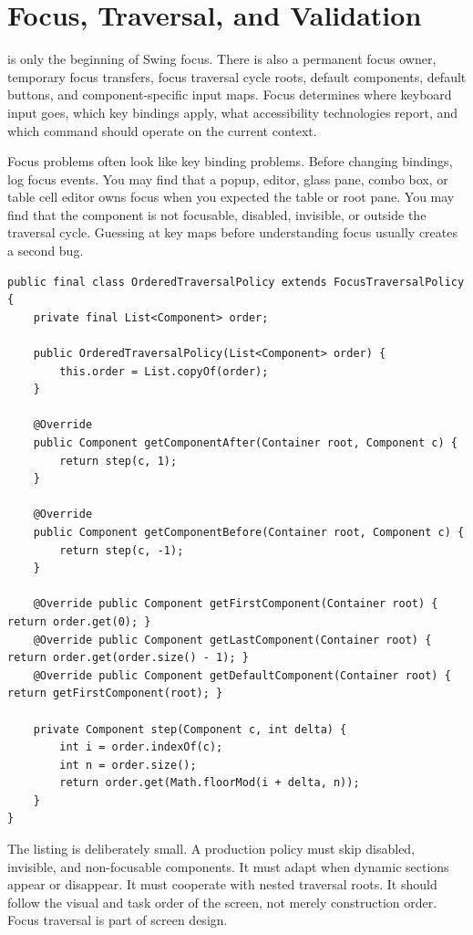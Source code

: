 \section{Focus, Traversal, and Validation}

 is only the beginning of Swing focus. There is also a permanent focus owner, temporary focus transfers, focus traversal cycle roots, default components, default buttons, and component-specific input maps. Focus determines where keyboard input goes, which key bindings apply, what accessibility technologies report, and which command should operate on the current context.

Focus problems often look like key binding problems. Before changing bindings, log focus events. You may find that a popup, editor, glass pane, combo box, or table cell editor owns focus when you expected the table or root pane. You may find that the component is not focusable, disabled, invisible, or outside the traversal cycle. Guessing at key maps before understanding focus usually creates a second bug.

\begin{lstlisting}[caption={A simple ordered focus traversal policy.}]
public final class OrderedTraversalPolicy extends FocusTraversalPolicy {
    private final List<Component> order;

    public OrderedTraversalPolicy(List<Component> order) {
        this.order = List.copyOf(order);
    }

    @Override
    public Component getComponentAfter(Container root, Component c) {
        return step(c, 1);
    }

    @Override
    public Component getComponentBefore(Container root, Component c) {
        return step(c, -1);
    }

    @Override public Component getFirstComponent(Container root) { return order.get(0); }
    @Override public Component getLastComponent(Container root) { return order.get(order.size() - 1); }
    @Override public Component getDefaultComponent(Container root) { return getFirstComponent(root); }

    private Component step(Component c, int delta) {
        int i = order.indexOf(c);
        int n = order.size();
        return order.get(Math.floorMod(i + delta, n));
    }
}
\end{lstlisting}

The listing is deliberately small. A production policy must skip disabled, invisible, and non-focusable components. It must adapt when dynamic sections appear or disappear. It must cooperate with nested traversal roots. It should follow the visual and task order of the screen, not merely construction order. Focus traversal is part of screen design.

